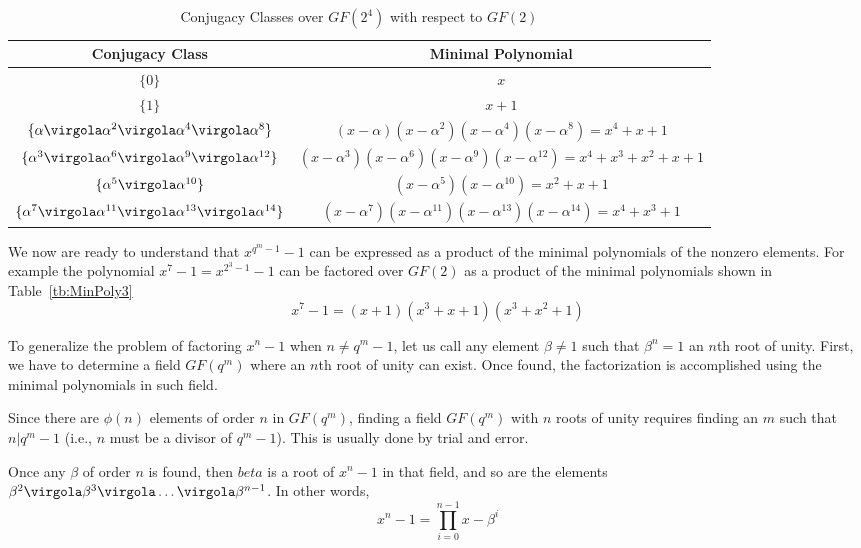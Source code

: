 \begin{table}\centering
\begin{tabular}{c| c}
Conjugacy Class & Minimal Polynomial\\
\hline
\(\{ 0\}\) & \(x\) \\
\(\{ 1\}\) & \(x+1\) \\
\(\{ \alpha \virgola \alpha^2 \virgola \alpha^4 \virgola \alpha^8\}\) &
\( (x-\alpha)(x-\alpha^2)(x-\alpha^4)(x-\alpha^8)= x^4+x+1 \) \\
\(\{ \alpha^3 \virgola \alpha^6 \virgola \alpha^9 \virgola \alpha^{12} \}\) &
\( (x-\alpha^3)(x-\alpha^6)(x-\alpha^9)(x-\alpha^{12})= x^4+x^3+x^2+x+1 \) \\
\(\{ \alpha^5 \virgola \alpha^{10}\}\) &
\( (x-\alpha^5)(x-\alpha^{10})= x^2+x+1 \) \\
\(\{ \alpha^7 \virgola \alpha^{11} \virgola \alpha^{13} \virgola \alpha^{14}\}\) &
\( (x-\alpha^7)(x-\alpha^{11})(x-\alpha^{13})(x-\alpha^{14})= x^4+x^3+1 \)
\end{tabular}
\caption{ Conjugacy Classes over \(GF(2^4)\) with respect to \(GF(2)\) \label{tb:MinPoly4}}
\end{table}

We now are ready to understand that \(x^{q^m-1}-1\) can be expressed as a product of the minimal polynomials of the nonzero elements. For example the polynomial
\(x^7-1 = x^{2^3-1}-1\)
can be factored over \(GF(2)\) as a product of the minimal polynomials shown in Table~\ref{tb:MinPoly3}
\begin{equation}
x^7-1=(x+1)(x^3+x+1)(x^3+x^2+1)
\end{equation}

To generalize the problem of factoring \(x^n-1\) when \(n \ne q^m-1\), let us call any element \(\beta \ne 1\) such that \(\beta^n = 1\) an \(n\)th root of unity. First, we have to determine a field \(GF(q^m)\) where an \(n\)th root of unity can exist. Once found, the factorization is accomplished using the minimal polynomials in such field.

Since there are \( \phi(n)\) elements of order \(n\) in \(GF(q^m)\), finding a field \(GF(q^m)\) with \(n\) roots of unity requires finding an \(m\) such that \(n|q^m-1\) (i.e., \(n\) must be a divisor of \(q^m-1\)). This is usually done by trial and error.

Once any \(\beta\) of order \(n\) is found, then \(beta\) is a root of \(x^n-1\) in that field, and so are the elements \(\beta^2 \virgola \beta^3 \virgola \ldots \virgola \beta^{n-1} \). In other words,
\begin{equation}
x^n-1= \prod_{i=0}^{n-1}{x-\beta^i}
\end{equation}

